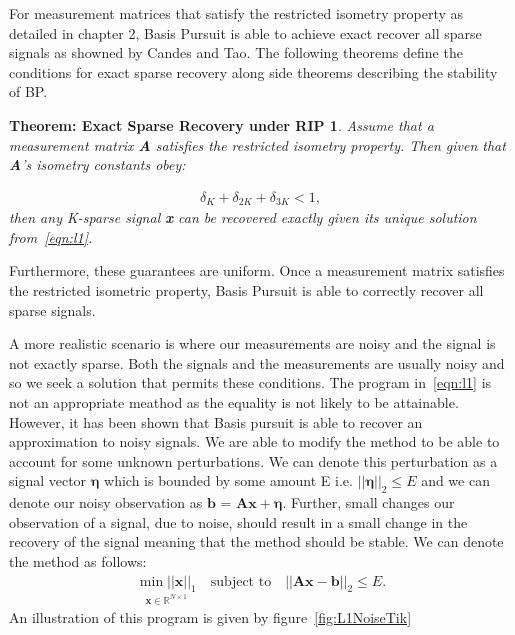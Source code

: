 \documentclass[titlepage,oneside, 12pt]{book}
\theoremstyle{break}
\begin{document}
\newpage 

For measurement matrices that satisfy the restricted isometry property as detailed in chapter 2, Basis Pursuit is able to achieve exact recover all sparse signals as showned by Candes and Tao\cite{delin}. The following theorems  define the  conditions for exact sparse recovery along side theorems describing the stability of BP. 


\newtheorem*{ESR}{Theorem: Exact Sparse Recovery under RIP}
\begin{ESR}
Assume that a measurement matrix \textbf{A} satisfies the restricted isometry property. Then given that \textbf{A}'s isometry constants obey: 

\begin{equation}
\begin{gathered}
\delta_K + \delta_{2K} + \delta_{3K} < 1, 
\end{gathered}
\label{eqn:ESR}
\end{equation}
then any K-sparse signal \textbf{x} can be recovered exactly given its unique solution from~\ref{eqn:l1}. 
\end{ESR}

Furthermore, these guarantees are uniform. Once a measurement matrix satisfies the restricted isometric property, Basis Pursuit is able to correctly recover all sparse signals.

A more realistic scenario is where our measurements are noisy and the signal is not exactly sparse. Both the signals and the measurements are usually noisy and so we seek a solution that permits these conditions. The program in~\ref{eqn:l1} is not an appropriate meathod as the equality is not likely to be attainable. However, it has been shown that Basis pursuit is able to recover an approximation to noisy signals\cite{SSR}. We are able to modify the method to be able to account for some unknown perturbations. We can denote this perturbation as a signal vector $\pmb{\eta}$ which is bounded by some amount E i.e. $||\pmb{\eta}||_2 \leq E$  and we can denote our noisy observation as $\textbf{b = Ax} + \pmb{\eta}$.  
Further, small changes our observation of a signal, due to noise, should result in a small change in the recovery of the signal meaning that the method should be stable. We can denote the method as follows: 
\begin{equation}
\begin{gathered}
\underset{\textbf{x} \in \mathbb{R}^{N \times 1}}{\min ||\textbf{x}||_{1}} \quad \text{subject to} \quad ||\textbf{Ax} - \textbf{b}||_2 \leq E. 
\end{gathered}
\label{eqn:l1Quad}
\end{equation}
An illustration of this program is given by figure~\ref{fig:L1NoiseTik}
\end{document}
